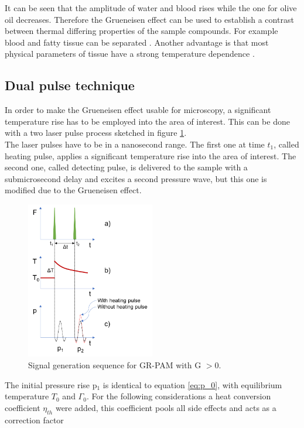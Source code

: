 It can be seen that the amplitude of water and blood rises while the one for olive oil decreases. Therefore the Grueneisen effect can be used to establish a contrast between thermal differing properties of the sample compounds. For example blood and fatty tissue can be separated \cite{Tian:15}. Another advantage is that most physical parameters of tissue have a strong temperature dependence \cite{Jacques:opticalPropsBiotissue}. 

\subsection{Dual pulse technique}
\label{sec:dualPulseTechnique}

In order to make the Grueneisen effect usable for microscopy, a significant temperature rise has to be employed into the area of interest. This can be done with a two laser pulse process sketched in figure \ref{fig:doublePulse}.\\
The laser pulses have to be in a nanosecond range. The first one at time $t_1$, called heating pulse, applies a significant temperature rise into the area of interest. The second one, called detecting pulse, is delivered to the sample with a submicrosecond delay and excites a second pressure wave, but this one is modified due to the Grueneisen effect. 

\begin{figure}[H]
	\centering
	\includegraphics[width = 0.5\textwidth]{03_GR-PAM_theory/images/dualPulse.png}
	\caption{Signal generation sequence for GR-PAM with G $>0$.}
	\label{fig:doublePulse}
\end{figure}

The initial pressure rise p$_1$ is identical to equation \ref{eq:p_0}, with equilibrium temperature $T_0$ and $\Gamma_0$. For the following considerations a heat conversion coefficient $\eta_{th}$ were added, this coefficient pools all side effects and acts as a correction factor

